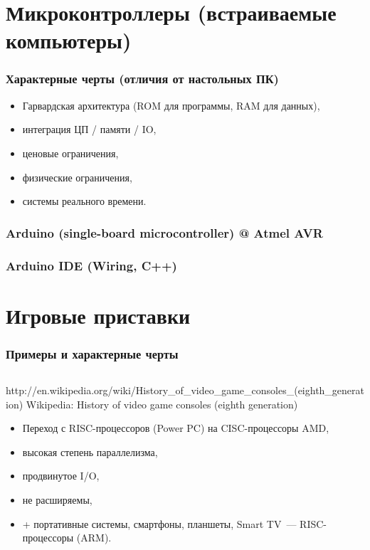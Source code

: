 \section {Микроконтроллеры (встраиваемые компьютеры)}

\begin{frame}
\frametitle{Характерные черты (отличия от настольных ПК)}
\begin{itemize}[<+->]
    \item Гарвардская архитектура (ROM для программы, RAM для данных),
    \item интеграция ЦП / памяти / IO,
    \item ценовые ограничения,
    \item физические ограничения,
    \item системы реального времени.
\end{itemize}
\end{frame}

\begin{frame}
\frametitle{Arduino (single-board microcontroller) @ Atmel AVR}
\end{frame}

\begin{frame}
\frametitle{Arduino IDE (Wiring, C++)}
\end{frame}

\section {Игровые приставки}

\begin{frame}
\frametitle{Примеры и характерные черты}
\begin{columns}
    \column{6cm}

    \column{6cm}
\end{columns}
\pause
\link%
    {http://en.wikipedia.org/wiki/History_of_video_game_consoles_(eighth_generation)}%
    {Wikipedia: History of video game consoles (eighth generation)}

\pause\begin{itemize}[<+->]
    \item Переход с RISC-процессоров (Power PC) на CISC-процессоры AMD,
    \item высокая степень параллелизма,
    \item продвинутое I/O,
    \item не расширяемы,
    \item + портативные системы, смартфоны, планшеты, Smart TV~— RISC-процессоры (ARM).
\end{itemize}

\end{frame}

